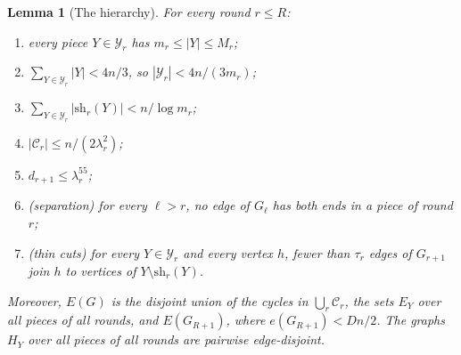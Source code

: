 \documentclass[11pt]{article}
\newtheorem{lemma}[theorem]{Lemma}
\theoremstyle{definition}
\theoremstyle{remark}
\numberwithin{equation}{section}
\numberwithin{figure}{section}
\numberwithin{table}{section}
\newcommand{\cC}{\mathcal{C}}
\newcommand{\cY}{\mathcal{Y}}
\newcommand{\sh}{\mathrm{sh}}
\begin{document}
\begin{lemma}[The hierarchy]\label{lem:hierarchy}
For every round $r\le R$:
\begin{enumerate}[label=\textup{(H\arabic*)},leftmargin=3.2em,itemsep=1pt]
\item\label{it:H-size} every piece $Y\in\cY_r$ has $m_r\le|Y|\le M_r$;
\item\label{it:H-overlap} $\sum_{Y\in\cY_r}|Y|<4n/3$, so $|\cY_r|<4n/(3m_r)$;
\item\label{it:H-shared} $\sum_{Y\in\cY_r}|\sh_r(Y)|<n/\log m_r$;
\item\label{it:H-cycles} $|\cC_r|\le n/(2\lambda_r^2)$;
\item\label{it:H-degree} $d_{r+1}\le\lambda_r^{55}$;
\item\label{it:H-sep} \emph{(separation)} for every $\ell>r$, no edge of
$G_\ell$ has both ends in a piece of round $r$;
\item\label{it:H-thin} \emph{(thin cuts)} for every $Y\in\cY_r$ and every vertex
$h$, fewer than $\tau_r$ edges of $G_{r+1}$ join $h$ to vertices of
$Y\setminus\sh_r(Y)$.
\end{enumerate}
Moreover, $E(G)$ is the disjoint union of the cycles in $\bigcup_r\cC_r$, the
sets $E_Y$ over all pieces of all rounds, and $E(G_{R+1})$, where
$e(G_{R+1})<Dn/2$. The graphs $H_Y$ over all pieces of all rounds are pairwise
edge-disjoint.
\end{lemma}
\end{document}
